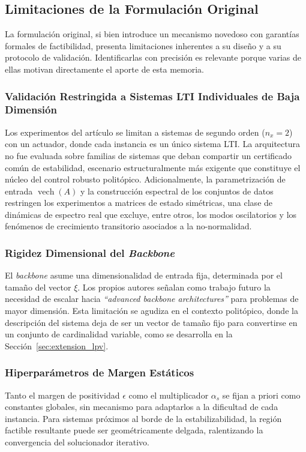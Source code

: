 \subsection{Limitaciones de la Formulación Original}
\label{subsec:limitaciones_vanilla}

La formulación original, si bien introduce un mecanismo novedoso con garantías 
formales de factibilidad, presenta limitaciones inherentes a su diseño y a su 
protocolo de validación. Identificarlas con precisión es relevante porque varias de 
ellas motivan directamente el aporte de esta memoria.

\subsubsection{Validación Restringida a Sistemas LTI Individuales de Baja Dimensión}
Los experimentos del artículo se limitan a sistemas de segundo orden ($n_x = 2$) con 
un actuador, donde cada instancia es un único sistema LTI. La arquitectura no fue 
evaluada sobre familias de sistemas que deban compartir un certificado común de 
estabilidad, escenario estructuralmente más exigente que constituye el núcleo del 
control robusto politópico. Adicionalmente, la parametrización de entrada 
$\operatorname{vech}(A)$ y la construcción espectral de los conjuntos de datos 
restringen los experimentos a matrices de estado simétricas, una clase de dinámicas de 
espectro real que excluye, entre otros, los modos oscilatorios y los fenómenos de 
crecimiento transitorio asociados a la no-normalidad.

\subsubsection{Rigidez Dimensional del \textit{Backbone}}
El \textit{backbone} asume una dimensionalidad de entrada fija, determinada por el 
tamaño del vector $\xi$. Los propios autores señalan como trabajo futuro la necesidad 
de escalar hacia \textit{``advanced backbone architectures''} para problemas de mayor 
dimensión. Esta limitación se agudiza en el contexto politópico, donde la descripción 
del sistema deja de ser un vector de tamaño fijo para convertirse en un conjunto de 
cardinalidad variable, como se desarrolla en la Sección~\ref{sec:extension_lpv}.

\subsubsection{Hiperparámetros de Margen Estáticos}
Tanto el margen de positividad $\epsilon$ como el multiplicador $\alpha_s$ se fijan a 
priori como constantes globales, sin mecanismo para adaptarlos a la dificultad de cada 
instancia. Para sistemas próximos al borde de la estabilizabilidad, la región factible 
resultante puede ser geométricamente delgada, ralentizando la convergencia del 
solucionador iterativo.


